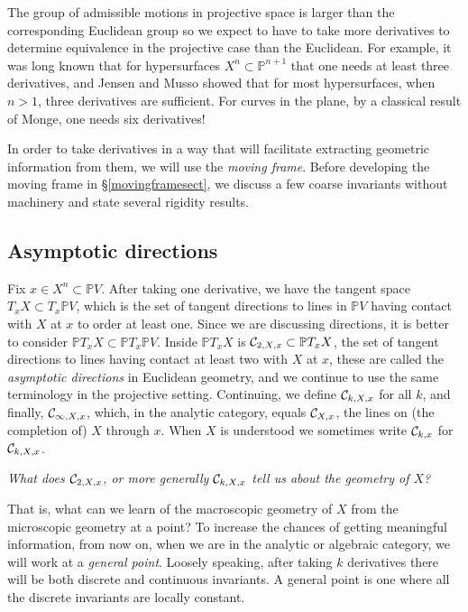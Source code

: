 \documentclass[11pt]{amsart}
\theoremstyle{definition}
\theoremstyle{remark}
\numberwithin{equation}{section}
\def\BP{\mathbb P}
\def\pp#1{\mathbb P^{#1}}
\def\pp#1{{\mathbb P}^{#1}}
\begin{document}
The group of admissible motions  in projective space is  larger than   the
corresponding
Euclidean group so we expect to have to take more derivatives
to determine equivalence in the projective case than the Euclidean. For example, it
was long known that for hypersurfaces $X^n\subset\pp{n+1}$
that one needs at least three derivatives,
and Jensen and Musso \cite{JM}
showed that for most hypersurfaces, when $n>1$, three
derivatives are sufficient. For curves in the plane,
by a classical result of Monge, one
needs six derivatives!

In order to take derivatives in a way that will facilitate
extracting geometric information from them, we will use
the {\it moving frame}. Before developing the moving frame
in \S\ref{movingframesect}, we discuss
a few coarse invariants without machinery and state several
rigidity results.

\subsection{Asymptotic directions}
Fix $x\in X^n\subset \BP V$. After taking one derivative,
we have the tangent space $T_xX\subset T_x\BP V$, which is
the set of tangent directions to lines in $\BP V$ having
contact with $X$ at $x$ to order at least one. Since we
are discussing directions, it is better to consider
$\BP T_xX\subset \BP T_x\BP V$. Inside $\BP T_xX$ is
$\cC_{2,X,x}\subset \BP T_xX$, the set of tangent directions
to lines having contact at least two with $X$ at $x$, these
are called the {\it asymptotic directions } in Euclidean geometry,
and we continue to use the same terminology in the projective setting.
Continuing, we define ${\mathcal C}_{k,X,x}$ for all $k$, and finally,
${\mathcal C}_{\infty,X,x}$, which, in the analytic category, equals ${\mathcal C}_{X,x}$, the lines on (the completion of)
$X$ through $x$.
When $X$ is understood we sometimes write ${\mathcal C}_{k,x}$ for ${\mathcal C}_{k,X,x}$.
 

\medskip

{\it What does ${\mathcal C}_{2,X,x}$, or more generally
${\mathcal C}_{k,X,x}$ tell us about the
geometry of $X$?}

\medskip

That is, what can we learn of the macroscopic geometry
of $X$ from the microscopic geometry at a point?
To increase the chances of getting meaningful information,
from now on, when we are in the analytic or algebraic
category,  we will work at a {\it general point}. Loosely
speaking, after taking $k$ derivatives there will be both
discrete   and continuous invariants. A general point is one where all the discrete invariants
are locally constant.  
\end{document}
